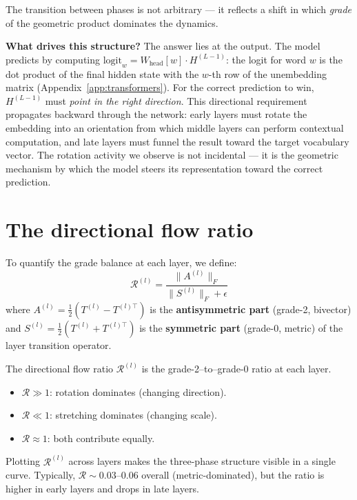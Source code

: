 \documentclass[11pt, twoside, openright]{memoir}
\begin{document}
The transition between phases is not arbitrary --- it reflects a shift
in which \emph{grade} of the geometric product dominates the dynamics.

\textbf{What drives this structure?}  The answer lies at the output.
The model predicts by computing $\mathrm{logit}_w = W_{\mathrm{head}}[w] \cdot H^{(L-1)}$:
the logit for word $w$ is the dot product of the final hidden state with
the $w$-th row of the unembedding matrix (Appendix~\ref{app:transformers}).
For the correct prediction to win, $H^{(L-1)}$ must \emph{point in the
right direction}.  This directional requirement propagates backward
through the network: early layers must rotate the embedding into an
orientation from which middle layers can perform contextual computation,
and late layers must funnel the result toward the target vocabulary
vector.  The rotation activity we observe is not incidental --- it is the
geometric mechanism by which the model steers its representation toward
the correct prediction.

\section{The directional flow ratio}

To quantify the grade balance at each layer, we define:
\[
  \mathcal{R}^{(l)} = \frac{\|A^{(l)}\|_F}{\|S^{(l)}\|_F + \epsilon}
\]
where $A^{(l)} = \frac{1}{2}(T^{(l)} - T^{(l)\top})$ is the
\textbf{antisymmetric part} (grade-2, bivector) and
$S^{(l)} = \frac{1}{2}(T^{(l)} + T^{(l)\top})$ is the
\textbf{symmetric part} (grade-0, metric) of the layer transition
operator.

\begin{keyidea}
The directional flow ratio $\mathcal{R}^{(l)}$ is the grade-2--to--grade-0
ratio at each layer.
\begin{itemize}[nosep]
\item $\mathcal{R} \gg 1$: rotation dominates (changing direction).
\item $\mathcal{R} \ll 1$: stretching dominates (changing scale).
\item $\mathcal{R} \approx 1$: both contribute equally.
\end{itemize}
Plotting $\mathcal{R}^{(l)}$ across layers makes the three-phase
structure visible in a single curve.  Typically,
$\mathcal{R} \sim 0.03$--$0.06$ overall (metric-dominated), but the
ratio is higher in early layers and drops in late layers.
\end{keyidea}
\end{document}
